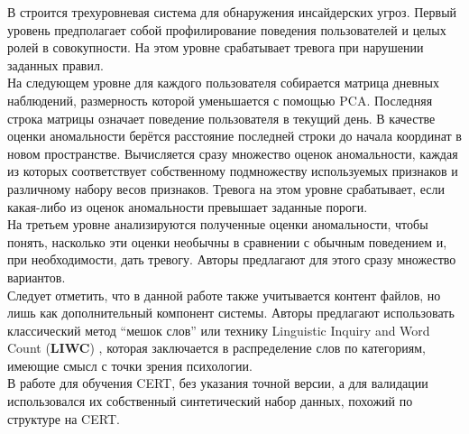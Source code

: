 В \cite{leggAutomatedInsiderThreat2017} строится трехуровневая система для обнаружения инсайдерских угроз. Первый уровень предполагает собой профилирование поведения пользователей и целых ролей в совокупности. На этом уровне срабатывает тревога при нарушении заданных правил.\\
 На следующем уровне для каждого пользователя собирается матрица дневных наблюдений, размерность которой уменьшается с помощью PCA. Последняя строка матрицы означает поведение пользователя в текущий день. В качестве оценки аномальности берётся расстояние последней строки до начала координат в новом пространстве. Вычисляется сразу множество оценок аномальности, каждая из которых соответствует собственному подмножеству используемых признаков и различному набору весов признаков. Тревога на этом уровне срабатывает, если какая-либо из оценок аномальности превышает заданные пороги.\\
 На третьем уровне анализируются полученные оценки аномальности, чтобы понять, насколько эти оценки необычны в сравнении с обычным поведением и, при необходимости, дать тревогу. Авторы предлагают для этого сразу множество вариантов.\\
Следует отметить, что в данной работе также учитывается контент файлов, но лишь как дополнительный компонент системы. Авторы предлагают использовать классический метод ``мешок слов'' или технику Linguistic Inquiry and Word Count (\textbf{LIWC}) \cite{tausczikPsychologicalMeaningWords2010}, которая заключается в распределение слов по категориям, имеющие смысл с точки зрения психологии.\\
В работе для обучения CERT, без указания точной версии, а для валидации использовался их собственный синтетический набор данных, похожий по структуре на CERT.
\\


